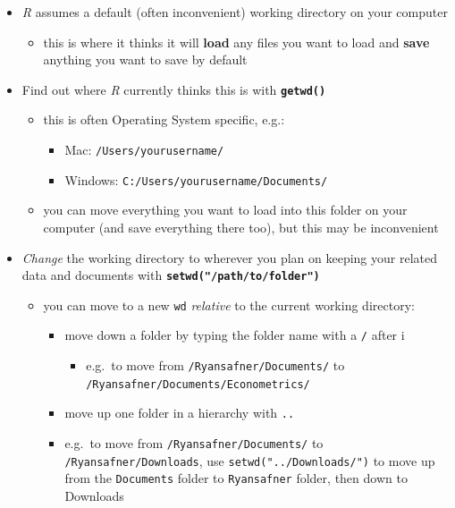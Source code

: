 \documentclass[]{book}
\providecommand{\tightlist}{%
  \setlength{\itemsep}{0pt}\setlength{\parskip}{0pt}}
\theoremstyle{definition}
\theoremstyle{definition}
\theoremstyle{definition}
\theoremstyle{remark}
\begin{document}
\begin{itemize}
\tightlist
\item
  \emph{R} assumes a default (often inconvenient) working directory on
  your computer

  \begin{itemize}
  \tightlist
  \item
    this is where it thinks it will \textbf{load} any files you want to
    load and \textbf{save} anything you want to save by default
  \end{itemize}
\item
  Find out where \emph{R} currently thinks this is with
  \textbf{\texttt{getwd()}}

  \begin{itemize}
  \tightlist
  \item
    this is often Operating System specific, e.g.:

    \begin{itemize}
    \tightlist
    \item
      Mac: \texttt{/Users/yourusername/}
    \item
      Windows: \texttt{C:/Users/yourusername/Documents/}
    \end{itemize}
  \item
    you can move everything you want to load into this folder on your
    computer (and save everything there too), but this may be
    inconvenient
  \end{itemize}
\item
  \emph{Change} the working directory to wherever you plan on keeping
  your related data and documents with
  \textbf{\texttt{setwd("/path/to/folder")}}

  \begin{itemize}
  \tightlist
  \item
    you can move to a new \texttt{wd} \emph{relative} to the current
    working directory:

    \begin{itemize}
    \tightlist
    \item
      move down a folder by typing the folder name with a \texttt{/}
      after i

      \begin{itemize}
      \tightlist
      \item
        e.g.~to move from \texttt{/Ryansafner/Documents/} to
        \texttt{/Ryansafner/Documents/Econometrics/}
      \end{itemize}
    \item
      move up one folder in a hierarchy with \texttt{..}
    \item
      e.g.~to move from \texttt{/Ryansafner/Documents/} to
      \texttt{/Ryansafner/Downloads}, use
      \texttt{setwd("../Downloads/")} to move up from the
      \texttt{Documents} folder to \texttt{Ryansafner} folder, then down
      to Downloads
    \end{itemize}
  \end{itemize}
\end{itemize}
\end{document}
